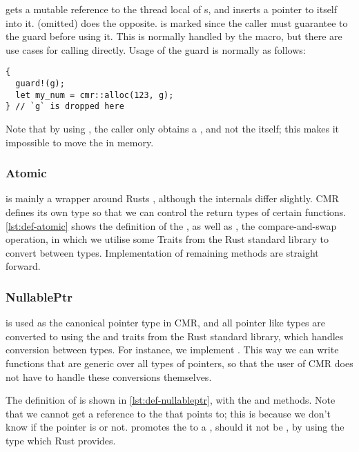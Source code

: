 \begin{figure}

\end{figure}

 gets a mutable reference to the thread local  of s,
and inserts a pointer to itself into it.  (omitted) does the opposite.
 is marked  since the caller must guarantee to  the
guard before using it. This is normally handled by the  macro, but there are use cases
for calling  directly. Usage of the guard is normally as follows:
\begin{lstlisting}[style=Rust]
{
  guard!(g);
  let my_num = cmr::alloc(123, g);
} // `g` is dropped here
\end{lstlisting}
Note that by using , the caller only obtains a , and not the
 itself; this makes it impossible to move the  in memory.


\subsubsection{Atomic}

 is mainly a wrapper around Rusts , although the internals differ
slightly. CMR defines its own type so that we can control the return types of certain functions.
\cref{lst:def-atomic} shows the definition of the , as well as , the
compare-and-swap operation, in which we utilise some Traits from the Rust standard library to
convert between types.  Implementation of remaining methods are straight forward.




\subsubsection{NullablePtr}

 is used as the canonical pointer type in CMR, and all pointer like types are
converted to  using the  and  traits from the Rust standard
library, which handles conversion between types. For instance, we implement . This way we can write functions that are generic over all types of pointers, so
that the user of CMR does not have to handle these conversions themselves.


The definition of  is shown in \cref{lst:def-nullableptr}, with the 
and  methods. Note that we cannot get a reference to the  that 
points to; this is because we don't know if the pointer is  or not.  promotes
the  to a , should it not be , by using the 
type which Rust provides.

